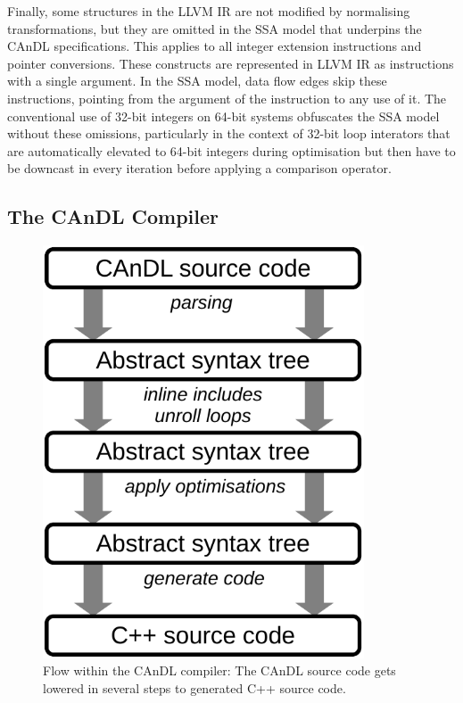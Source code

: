     Finally, some structures in the LLVM IR are not modified by normalising
    transformations, but they are omitted in the SSA model that underpins the
    CAnDL specifications.
    This applies to all integer extension instructions and pointer conversions.
    These constructs are represented in LLVM IR as instructions with a single
    argument.
    In the SSA model, data flow edges skip these instructions, pointing from the
    argument of the instruction to any use of it.
    The conventional use of 32-bit integers on 64-bit systems obfuscates the
    SSA model without these omissions, particularly in the context of 32-bit
    loop interators that are automatically elevated to 64-bit integers during
    optimisation but then have to be downcast in every iteration before applying
    a comparison operator.

\subsection{The CAnDL Compiler}

\begin{figure}[t]
\centering
\begin{minipage}{0.7\textwidth}
\centering
\includegraphics[width=0.85\textwidth]{figures/candlstages.pdf}
\caption{Flow within the CAnDL compiler:
         The CAnDL source code gets lowered in several steps to generated C++
         source code.}
\label{fig:compilerflow}
\end{minipage}
\end{figure}

